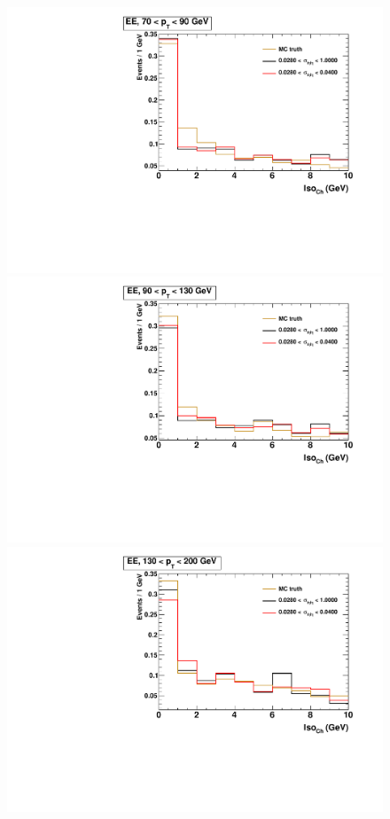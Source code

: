 \begin{figure}[!htbp]
\begin{multicols}{2}
		\includegraphics[scale=0.29]{figures/closure_test_fake_template_chIso_EE_pt70To90_sample_all.pdf} \\
		\includegraphics[scale=0.29]{figures/closure_test_fake_template_chIso_EE_pt90To130_sample_all.pdf} \\
		\includegraphics[scale=0.29]{figures/closure_test_fake_template_chIso_EE_pt130To200_sample_all.pdf} \\

\end{multicols}
\end{figure}

